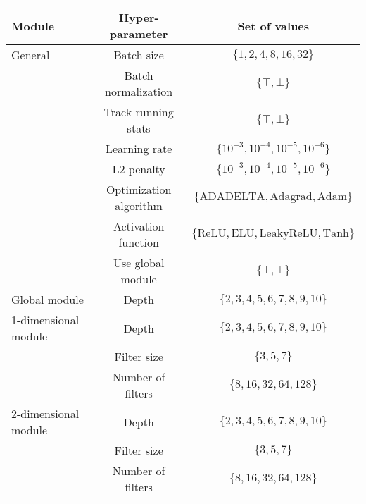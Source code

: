   \begin{table}[H]
    \centering
    \begin{tabular}{|l|c|c|}
      \hline
      Module & Hyper-parameter & Set of values \\
      \hline
      \hline
      General & Batch size & $\{ 1, 2, 4, 8, 16, 32 \}$ \\
              & Batch normalization & $\{ \top, \bot \}$ \\
              & Track running stats & $\{ \top, \bot \}$ \\
              & Learning rate & $\{ 10^{-3}, 10^{-4}, 10^{-5}, 10^{-6} \}$ \\
              & L2 penalty & $\{ 10^{-3}, 10^{-4}, 10^{-5}, 10^{-6} \}$ \\
              & Optimization algorithm & $\{ \text{ADADELTA}, \text{Adagrad}, \text{Adam} \}$ \\
              & Activation function & $\{ \text{ReLU}, \text{ELU}, \text{LeakyReLU}, \text{Tanh} \}$ \\
              & Use global module & $\{ \top, \bot \}$ \\
      \hline
      Global module & Depth & $\{ 2, 3, 4, 5, 6, 7, 8, 9, 10 \}$ \\
      \hline
      1-dimensional module & Depth & $\{ 2, 3, 4, 5, 6, 7, 8, 9, 10 \}$ \\
                           & Filter size & $\{ 3, 5, 7 \}$ \\
                           & Number of filters & $\{ 8, 16, 32, 64, 128 \}$ \\
      \hline
      2-dimensional module & Depth & $\{ 2, 3, 4, 5, 6, 7, 8, 9, 10 \}$ \\
                           & Filter size & $\{ 3, 5, 7 \}$ \\
                           & Number of filters & $\{ 8, 16, 32, 64, 128 \}$ \\
      \hline
    \end{tabular}
    \label{hyperparams}
  \end{table}

